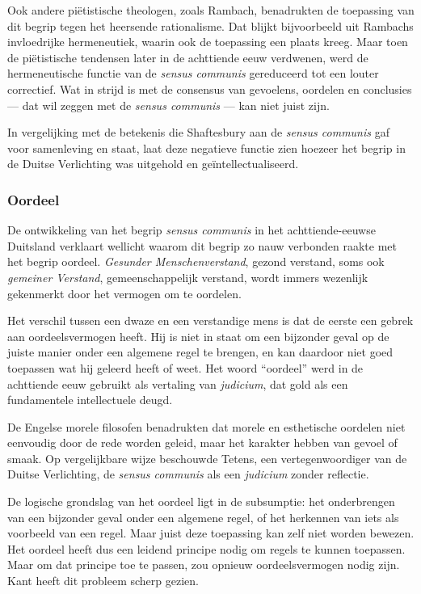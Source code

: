 Ook andere piëtistische theologen, zoals Rambach, benadrukten de toepassing van dit begrip tegen het heersende rationalisme. Dat blijkt bijvoorbeeld uit Rambachs invloedrijke hermeneutiek, waarin ook de toepassing een plaats kreeg. Maar toen de piëtistische tendensen later in de achttiende eeuw verdwenen, werd de hermeneutische functie van de \textit{sensus communis} gereduceerd tot een louter correctief. Wat in strijd is met de consensus van gevoelens, oordelen en conclusies — dat wil zeggen met de \textit{sensus communis} — kan niet juist zijn.

In vergelijking met de betekenis die Shaftesbury aan de \textit{sensus communis} gaf voor samenleving en staat, laat deze negatieve functie zien hoezeer het begrip in de Duitse Verlichting was uitgehold en geïntellectualiseerd.

\subsubsection{Oordeel}

De ontwikkeling van het begrip \textit{sensus communis} in het achttiende-eeuwse Duitsland verklaart wellicht waarom dit begrip zo nauw verbonden raakte met het begrip oordeel. \textit{Gesunder Menschenverstand}, gezond verstand, soms ook \textit{gemeiner Verstand}, gemeenschappelijk verstand, wordt immers wezenlijk gekenmerkt door het vermogen om te oordelen.

Het verschil tussen een dwaze en een verstandige mens is dat de eerste een gebrek aan oordeelsvermogen heeft. Hij is niet in staat om een bijzonder geval op de juiste manier onder een algemene regel te brengen, en kan daardoor niet goed toepassen wat hij geleerd heeft of weet. Het woord ``oordeel'' werd in de achttiende eeuw gebruikt als vertaling van \textit{judicium}, dat gold als een fundamentele intellectuele deugd.

De Engelse morele filosofen benadrukten dat morele en esthetische oordelen niet eenvoudig door de rede worden geleid, maar het karakter hebben van gevoel of smaak. Op vergelijkbare wijze beschouwde Tetens, een vertegenwoordiger van de Duitse Verlichting, de \textit{sensus communis} als een \textit{judicium} zonder reflectie.

De logische grondslag van het oordeel ligt in de subsumptie: het onderbrengen van een bijzonder geval onder een algemene regel, of het herkennen van iets als voorbeeld van een regel. Maar juist deze toepassing kan zelf niet worden bewezen. Het oordeel heeft dus een leidend principe nodig om regels te kunnen toepassen. Maar om dat principe toe te passen, zou opnieuw oordeelsvermogen nodig zijn. Kant heeft dit probleem scherp gezien.

